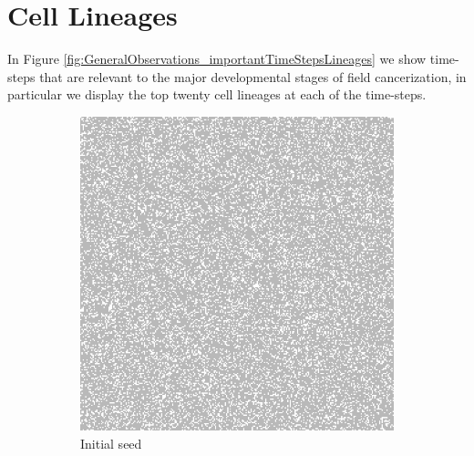 \documentclass[\main/thesis.tex]{subfiles}
\begin{document}
\section{Cell Lineages}
In Figure \ref{fig:GeneralObservations_importantTimeStepsLineages} we show time-steps that are relevant to the major developmental stages of field cancerization, in particular we display the top twenty cell lineages at each of the time-steps.
\begin{figure}[H]
    \centering
    \begin{subfigure}[t]{.45\textwidth}
      \centering
      \includegraphics[width=\textwidth]{images/2_GeneralObservations/Fig6/1_init.jpeg}
      \caption{Initial seed}
      \label{fig:GeneralObservations_initSeedLineages}
    \end{subfigure}
    \begin{subfigure}[t]{.45\textwidth}
      \centering

\end{subfigure}
\end{figure}
\end{document}
